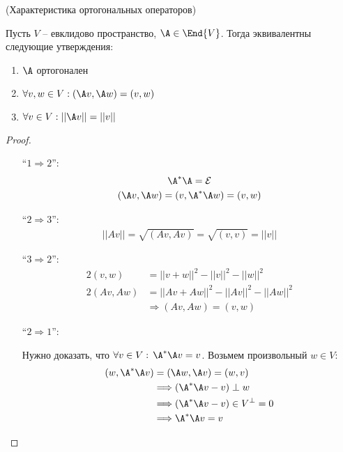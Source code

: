 \begin{theorem}(Характеристика ортогональных операторов)

    Пусть $V$ -- евклидово пространство, $\A \in \End{V}$.
    Тогда эквивалентны следующие утверждения:
    \begin{enumerate}
        \item $\A$ ортогонален
        \item $\forall v, w \in V: (\A v, \A w) = (v, w)$
        \item $\forall v \in V: ||\A v|| = || v || $
    \end{enumerate}
    \begin{proof} \quad

        \begin{itemize}
            \item[``$1 \Rightarrow 2$'':]
            \begin{gather*}
                \A^* \A = \mathcal{E} \\
                (\A v, \A w) = (v, \A^*\A w) = (v, w)
            \end{gather*} 
            \item[``$2 \Rightarrow 3$'':]
            \begin{gather*}
                ||Av|| = \sqrt{(Av, Av)} = \sqrt{(v, v)} = ||v||
            \end{gather*} 
            \item[``$3 \Rightarrow 2$'':]
            \begin{align*}
                2(v, w) &= ||v + w||^2 - ||v||^2 - ||w||^2 \\
                2(Av, Aw) &= ||Av + Aw||^2 - ||Av||^2 - ||Aw||^2 \\
                &\Longrightarrow (Av, Aw) = (v, w)
            \end{align*}  
            \item[``$2 \Rightarrow 1$'':]  \quad
             
            Нужно доказать, что $\forall v \in V: \, \A^* \A v = v$. Возьмем произвольный $w \in V$:
            \begin{align*}
                (w, \A^* \A v) &= (\A w, \A v) = (w, v) \\
                &\Longrightarrow (\A^* \A v - v) \perp w \\
                &\Longrightarrow (\A^* \A v - v) \in V^{\perp} = 0 \\
                &\Longrightarrow \A^* \A v = v
            \end{align*} 
        \end{itemize}
    \end{proof}    
\end{theorem}